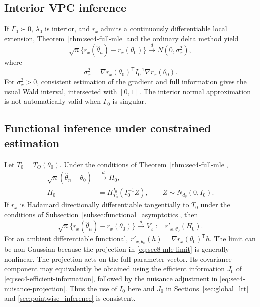 \subsection{Interior VPC inference}
\label{subsec:ci-interior}

If $\Gamma_0\succ0$, $\lambda_0$ is interior, and $r_x$ admits a
continuously differentiable local extension, Theorem~\ref{thm:sec4-full-mle}
and the ordinary delta method yield
\begin{equation}\label{eq:sec8-interior}
\sqrt n\{r_x(\widehat\theta_n)-r_x(\theta_0)\}
\xrightarrow{d}N(0,\sigma_x^2),
\end{equation}
where
\begin{equation}\label{eq:sec8-interior-var}
\sigma_x^2=\nabla r_x(\theta_0)^{\mathsf T}
I_0^{-1}\nabla r_x(\theta_0).
\end{equation}
For $\sigma_x^2>0$, consistent estimation of the gradient and full
information gives the usual Wald interval, intersected with $[0,1]$.
The interior normal approximation is not automatically valid when
$\Gamma_0$ is singular.

\subsection{Functional inference under constrained estimation}
\label{subsec:ci-boundary}

Let $T_0=T_\Theta(\theta_0)$. Under the conditions of
Theorem~\ref{thm:sec4-full-mle},
\begin{equation}\label{eq:sec8-mle-limit}
\begin{aligned}
\sqrt n(\widehat\theta_n-\theta_0)&\xrightarrow{d}H_0,\\
H_0&=\Pi_{T_0}^{I_0}(I_0^{-1}Z),
\qquad Z\sim N_{d_\theta}(0,I_0).
\end{aligned}
\end{equation}
If $r_x$ is Hadamard directionally differentiable tangentially to $T_0$
under the conditions of Subsection~\ref{subsec:functional_asymptotics},
then
\begin{equation}\label{eq:sec8-directional}
\sqrt n\{r_x(\widehat\theta_n)-r_x(\theta_0)\}
\xrightarrow{d}V_x:=r'_{x,\theta_0}(H_0).
\end{equation}
For an ambient differentiable functional,
$r'_{x,\theta_0}(h)=\nabla r_x(\theta_0)^{\mathsf T}h$.
The limit can be non-Gaussian because the projection in
\eqref{eq:sec8-mle-limit} is generally nonlinear.
The projection acts on the full parameter vector. Its covariance component
may equivalently be obtained using the efficient information $J_0$ of
\eqref{eq:sec4-efficient-information}, followed by the nuisance adjustment
in \eqref{eq:sec4-nuisance-projection}. Thus the use of $I_0$ here and
$J_0$ in Sections~\ref{sec:global_lrt} and
\ref{sec:pointwise_inference} is consistent.

